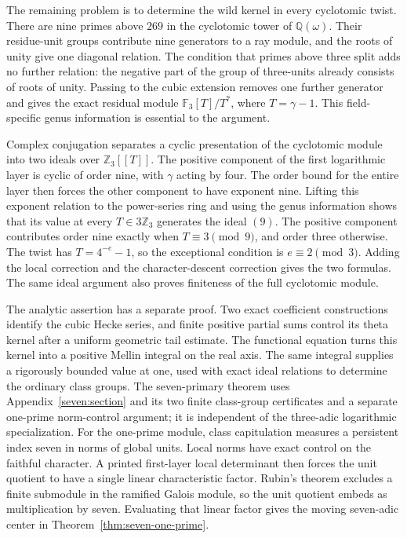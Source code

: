 \documentclass[11pt]{article}
\theoremstyle{remark}\newtheorem{remark}[theorem]{Remark}
\newcommand{\Z}{\mathbb Z}\newcommand{\Q}{\mathbb Q}\newcommand{\F}{\mathbb F}
\begin{document}
The remaining problem is to determine the wild kernel in every cyclotomic twist.
There are nine primes above $269$ in the cyclotomic tower of $\Q(\omega)$.
Their residue-unit groups contribute nine generators to a ray module, and the roots of unity give one diagonal relation.
The condition that primes above three split adds no further relation: the negative part of the group of three-units already consists of roots of unity.
Passing to the cubic extension removes one further generator and gives the exact residual module $\F_3[T]/T^7$, where $T=\gamma-1$.
This field-specific genus information is essential to the argument.

Complex conjugation separates a cyclic presentation of the cyclotomic module into two ideals over $\Z_3[[T]]$.
The positive component of the first logarithmic layer is cyclic of order nine, with $\gamma$ acting by four.
The order bound for the entire layer then forces the other component to have exponent nine.
Lifting this exponent relation to the power-series ring and using the genus information shows that its value at every $T\in3\Z_3$ generates the ideal $(9)$.
The positive component contributes order nine exactly when $T\equiv3\pmod9$, and order three otherwise.
The twist has $T=4^{-e}-1$, so the exceptional condition is $e\equiv2\pmod3$.
Adding the local correction and the character-descent correction gives the two formulas.
The same ideal argument also proves finiteness of the full cyclotomic module.

The analytic assertion has a separate proof. Two exact coefficient constructions identify the cubic Hecke series, and finite positive partial sums control its theta kernel after a uniform geometric tail estimate. The functional equation turns this kernel into a positive Mellin integral on the real axis. The same integral supplies a rigorously bounded value at one, used with exact ideal relations to determine the ordinary class groups.
The seven-primary theorem uses Appendix~\ref{seven:section} and its two finite
class-group certificates and a separate one-prime norm-control argument;
it is independent of the three-adic logarithmic specialization.
For the one-prime module, class capitulation measures a persistent index
seven in norms of global units. Local norms have exact control on the
faithful character. A printed first-layer local determinant then forces
the unit quotient to have a single linear characteristic factor.
Rubin's theorem excludes a finite submodule in the ramified Galois
module, so the unit quotient embeds as multiplication by seven.
Evaluating that linear factor gives the moving seven-adic center in
Theorem~\ref{thm:seven-one-prime}.
\end{document}
